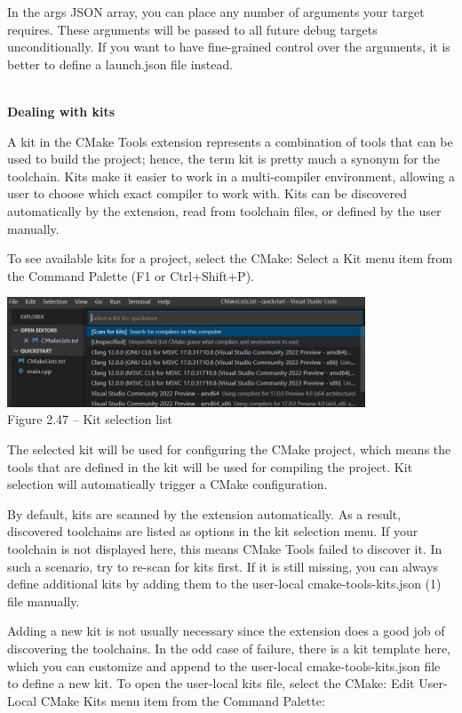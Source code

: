 In the args JSON array, you can place any number of arguments your target requires. These arguments will be passed to all future debug targets unconditionally. If you want to have fine-grained control over the arguments, it is better to define a launch.json file instead.

\hspace*{\fill} \\ %
\noindent
\textbf{Dealing with kits}

A kit in the CMake Tools extension represents a combination of tools that can be used to build the project; hence, the term kit is pretty much a synonym for the toolchain. Kits make it easier to work in a multi-compiler environment, allowing a user to choose which exact compiler to work with. Kits can be discovered automatically by the extension, read from toolchain files, or defined by the user manually.

To see available kits for a project, select the CMake: Select a Kit menu item from the Command Palette (F1 or Ctrl+Shift+P).

\begin{center}
\includegraphics[width=0.8\textwidth]{content/1/chapter2/images/47.jpg}\\
Figure 2.47 – Kit selection list
\end{center}

The selected kit will be used for configuring the CMake project, which means the tools that are defined in the kit will be used for compiling the project. Kit selection will automatically trigger a CMake configuration.

By default, kits are scanned by the extension automatically. As a result, discovered toolchains are listed as options in the kit selection menu. If your toolchain is not displayed here, this means CMake Tools failed to discover it. In such a scenario, try to re-scan for kits first. If it is still missing, you can always define additional kits by adding them to the user-local cmake-tools-kits.json (1) file manually.

Adding a new kit is not usually necessary since the extension does a good job of discovering the toolchains. In the odd case of failure, there is a kit template here, which you can customize and append to the user-local cmake-tools-kits.json file to define a new kit. To open the user-local kits file, select the CMake: Edit User-Local CMake Kits menu item from the Command Palette:

